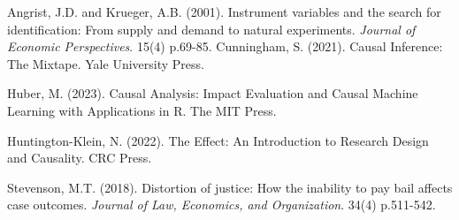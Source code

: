 \documentclass[
]{book}
\begin{document}
Angrist, J.D. and Krueger, A.B. (2001). Instrument variables and the search for identification: From supply and demand to natural experiments. \emph{Journal of Economic Perspectives}. 15(4) p.69-85.
Cunningham, S. (2021). Causal Inference: The Mixtape. Yale University Press.

Huber, M. (2023). Causal Analysis: Impact Evaluation and Causal Machine Learning with Applications in R. The MIT Press.

Huntington-Klein, N. (2022). The Effect: An Introduction to Research Design and Causality. CRC Press.

Stevenson, M.T. (2018). Distortion of justice: How the inability to pay bail affects case outcomes. \emph{Journal of Law, Economics, and Organization}. 34(4) p.511-542.


\end{document}
